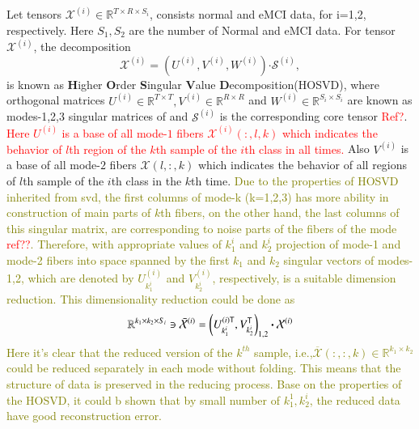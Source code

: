 \documentclass[preprint,12pt]{elsarticle}
\begin{document}
Let tensors $\mathcal{X}^{(i)}\in \mathbb{R}^{T\times R \times S_i}$, consists normal and eMCI data, for i=1,2, respectively.  Here $S_1,S_2$ are the number of Normal and eMCI data.
For tensor $\mathcal{X}^{(i)}$, the decomposition
\begin{equation}
\label{ho}
\mathcal{X}^{(i)} = 
\left(  
U^{(i)},V^{(i)},W^{(i)}
\right)\boldsymbol{\cdot} \mathcal{S}^{(i)},
\end{equation}
is known as \textbf{H}igher \textbf{O}rder \textbf{S}ingular \textbf{V}alue \textbf{D}ecomposition(HOSVD),
where orthogonal matrices $U^{(i)}\in \mathbb{R}^{T\times T}, V^{(i)}\in \mathbb{R}^{R\times R} $ and $W^{(i)}\in \mathbb{R}^{S_i\times S_i}$ are known as modes-1,2,3 singular matrices of 
and $\mathcal{S}^{(i)}$ is the corresponding core tensor \textcolor{red}{Ref?}. \textcolor{red}{ Here $U^{(i)}$ is a base of all mode-$ 1 $ fibers $\mathcal{X}^{(i)}(:,l,k)$
which indicates the behavior of $l$th region of the $k$th sample of the $i$th class in all times.} Also  $V^{(i)}$ is a base of all mode-$ 2 $ fibers $\mathcal{X}(l,:,k)$ which indicates the behavior of all regions of  $l$th  sample of the $i$th class in  the $k$th time.
\textcolor{olive}{Due to the properties of HOSVD inherited from svd, the first columns of mode-k (k=1,2,3) has more ability in construction of main parts of $k$th fibers, on the other hand, the last columns of  this singular matrix, are corresponding to noise parts of the fibers of the mode \textcolor{red}{ref??}. Therefore, with appropriate values of $k^i_1$ and $k^i_2$ projection of mode-1 and mode-2 fibers into space spanned by  the first $k_1$ and $k_2$ singular vectors of modes-1,2, which  are denoted by  $U^{(i)}_{k^i_1}$ and $V_{k^i_2}^{(i)}$, respectively,
is a suitable  dimension reduction. This dimensionality reduction could be done as}
\begin{align}
\label{m1}
\mathbb{R}^{k_1 \times k_2 \times S_i} \ni  \bar{{\mathcal{X}}}^{(i)} = \left( 
U^{(i) {\sf {T}}}_{k^i_1}, V_{k^i_2}^{\sf {T}}
\right)_{1,2}\boldsymbol{\cdot} \mathcal{X}^{(i)}
\end{align}
\textcolor{olive}{Here it's clear that the reduced version of the $k^{th}$ sample, i.e.,$\overline{\mathcal{X}}(:,:,k)\in \mathbb{R}^{k_1\times k_2}$ could be reduced separately  in each mode without folding. This means that the structure of data is preserved in the reducing process.
	Base on the properties of the  HOSVD, it could b shown that by small number of $k_1^1, k_2^i$, the reduced data have good reconstruction error. }
\end{document}
